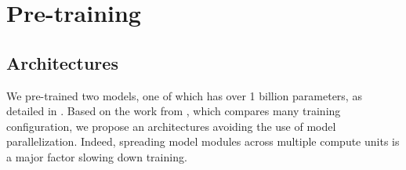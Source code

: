 
\section{Pre-training}







\subsection{Architectures} 

We pre-trained two models, one of which has over 1 billion parameters, as detailed in . Based on the work from \textcite{shoeybi_19}, which compares many training configuration, we propose an architectures avoiding the use of model parallelization. Indeed, spreading model modules across multiple compute units is a major factor slowing down training.

